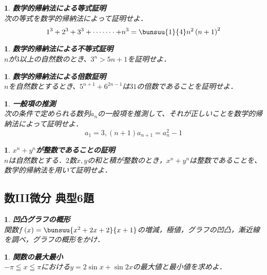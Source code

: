 \documentclass[10pt,
fleqn,
dvipdfmx,
uplatex
]{jsarticle}
\newtheorem{question}[Question]{}
\begin{document}
\begin{question}{\bf\boldmath 数学的帰納法による等式証明}\\
次の等式を数学的帰納法によって証明せよ．
\[1^3+2^3+3^3+\cdots \cdots \cdot +n^3=\bunsuu{1}{4}n^2\left(n+1\right)^2\]
\end{question}



\begin{question}{\bf\boldmath 数学的帰納法による不等式証明}\\
$n$が$3$以上の自然数のとき、$3^n>5n+1$を証明せよ．
\end{question}



\begin{question}{\bf\boldmath 数学的帰納法による倍数証明}\\
$n$を自然数とするとき、$5^{n+1}+6^{2n-1}$は${31}$の倍数であることを証明せよ．
\end{question}



\begin{question}{\bf\boldmath 一般項の推測}\\
次の条件で定められる数列${a_n}$の一般項を推測して、それが正しいことを数学的帰納法によって証明せよ．
\[a_1=3,\left(n+1\right)a_{n+1}=a_n^2-1\]
\end{question}



\begin{question}{\bf\boldmath $x^n+y^n$が整数であることの証明}\\
$n$は自然数とする．$2$数$x,y$の和と積が整数のとき，$x^n+y^n$は整数であることを、数学的帰納法を用いて証明せよ．
\end{question}

\subsection{数III微分 典型6題}



\begin{question}{\bf\boldmath 凹凸グラフの概形}\\
関数$f\left(x\right)=\bunsuu{{x^2+2x+2}}{{x+1}}$の増減，極値，グラフの凹凸，漸近線を調べ，グラフの概形をかけ．
\end{question}



\begin{question}{\bf\boldmath 関数の最大最小}\\
$-\pi \leqq x\leqq \pi$における$y=2\sin x+\sin 2x$の最大値と最小値を求めよ．
\end{question}
\end{document}
